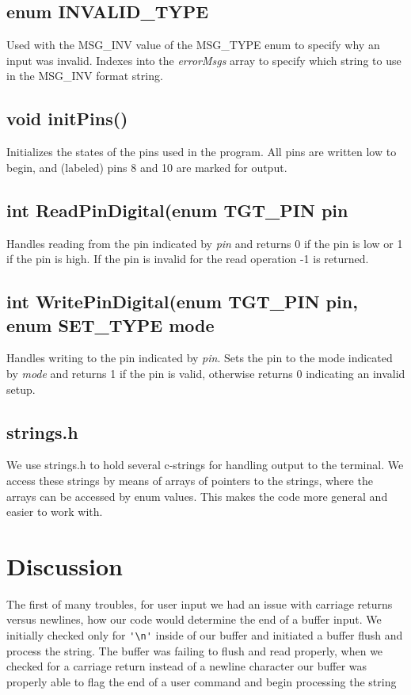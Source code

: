 \documentclass[letterpaper,11pt]{texMemo} %
\begin{document}
\subsection*{enum INVALID\_TYPE}
Used with the MSG\_INV value of the MSG\_TYPE enum to specify why an input was invalid. Indexes into the \textit{errorMsgs} array to specify which string to use in the MSG\_INV format string.
\subsection*{void initPins()}
Initializes the states of the pins used in the program. All pins are written low to begin, and (labeled) pins 8 and 10 are marked for output.
\subsection*{int ReadPinDigital(enum TGT\_PIN pin}
Handles reading from the pin indicated by \textit{pin} and returns 0 if the pin is low or 1 if the pin is high. If the pin is invalid for the read operation -1 is returned.
\subsection*{int WritePinDigital(enum TGT\_PIN pin, enum SET\_TYPE mode}
Handles writing to the pin indicated by \textit{pin}. Sets the pin to the mode indicated by \textit{mode} and returns 1 if the pin is valid, otherwise returns 0 indicating an invalid setup.
\subsection*{strings.h}
We use strings.h to hold several c-strings for handling output to the terminal. We access these strings by means of arrays of pointers to the strings, where the arrays can be accessed by enum values. This makes the code more general and easier to work with.

\section*{Discussion}

    The first of many troubles, for user input we had an issue with carriage returns versus newlines, 
how our code would determine the end of a buffer input. We initially checked only for \verb+'\n'+ inside of our
buffer and initiated a buffer flush and process the string. The buffer was failing to flush and read properly,
when we checked for a carriage return instead of a newline character our buffer was properly able to flag the 
end of a user command and begin processing the string
    
\end{document}
